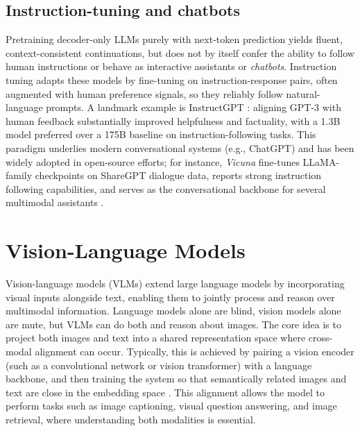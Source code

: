 \subsection{Instruction-tuning and chatbots}

Pretraining decoder-only LLMs purely with next-token prediction yields fluent, context-consistent continuations, but does not by itself confer the ability to follow human instructions or behave as interactive assistants or \emph{chatbots}. Instruction tuning \cite{weiFinetunedLanguageModels2022, zhangInstructionTuningLarge2024a, ouyangTrainingLanguageModels2022} adapts these models by fine-tuning on instruction-response pairs, often augmented with human preference signals, so they reliably follow natural-language prompts. A landmark example is InstructGPT \cite{ouyangTrainingLanguageModels2022}: aligning GPT-3 \cite{brownLanguageModelsAre2020} with human feedback substantially improved helpfulness and factuality, with a 1.3B model preferred over a 175B baseline on instruction-following tasks. This paradigm underlies modern conversational systems (e.g., ChatGPT) and has been widely adopted in open-source efforts; for instance, \emph{Vicuna} \cite{vicuna2023} fine-tunes LLaMA-family checkpoints on ShareGPT dialogue data, reports strong instruction following capabilities, and serves as the conversational backbone for several multimodal assistants \cite{liuVisualInstructionTuning2023, liuImprovedBaselinesVisual2024, zhuMiniGPT4EnhancingVisionLanguage2023}.

\section{Vision-Language Models}

Vision-language models (VLMs) extend large language models by incorporating visual inputs alongside text, enabling them to jointly process and reason over multimodal information. Language models alone are blind, vision models alone are mute, but VLMs can do both and reason about images. The core idea is to project both images and text into a shared representation space where cross-modal alignment can occur. Typically, this is achieved by pairing a vision encoder (such as a convolutional network or vision transformer) with a language backbone, and then training the system so that semantically related images and text are close in the embedding space \cite{radfordLearningTransferableVisual2021, liSurveyStateArt2025, liuVisualInstructionTuning2023, liBLIP2BootstrappingLanguageImage2023, liuImprovedBaselinesVisual2024, caffagniRevolutionMultimodalLarge2024}. This alignment allows the model to perform tasks such as image captioning, visual question answering, and image retrieval, where understanding both modalities is essential.

